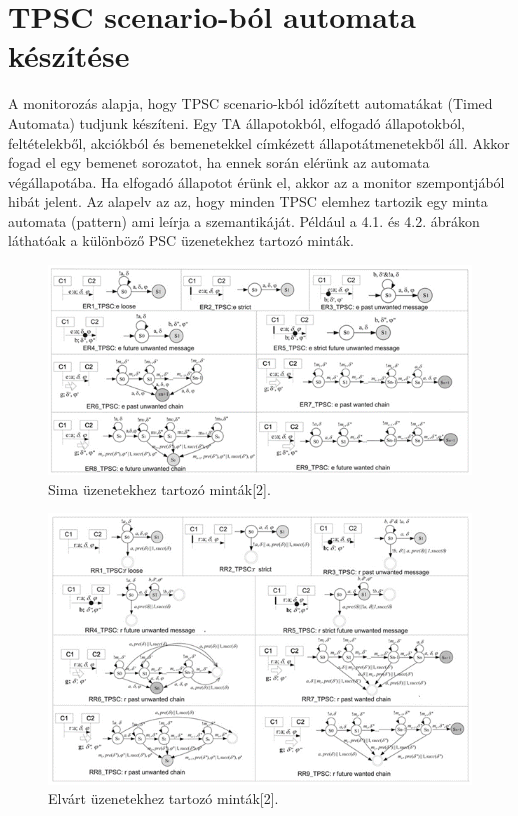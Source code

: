 \chapter{TPSC scenario-ból automata készítése}

A monitorozás alapja, hogy TPSC scenario-kból időzített automatákat (Timed Automata) tudjunk készíteni.
Egy TA állapotokból, elfogadó állapotokból, feltételekből, akciókból és bemenetekkel címkézett állapotátmenetekből áll.
Akkor fogad el egy bemenet sorozatot, ha ennek során elérünk az automata végállapotába.
Ha elfogadó állapotot érünk el, akkor az a monitor szempontjából hibát jelent.
Az alapelv az az, hogy minden TPSC elemhez tartozik egy minta automata (pattern) ami leírja a szemantikáját.
Például a 4.1. és 4.2. ábrákon láthatóak a különböző PSC üzenetekhez tartozó minták.

\begin{figure}[!ht]
    \centering
    \includegraphics[width=150mm, keepaspectratio]{figures/5abra.png}
    \caption{Sima üzenetekhez tartozó minták[2].}
\end{figure}

\begin{figure}[!ht]
    \centering
    \includegraphics[width=150mm, keepaspectratio]{figures/6abra.png}
    \caption{Elvárt üzenetekhez tartozó minták[2].}
\end{figure}

